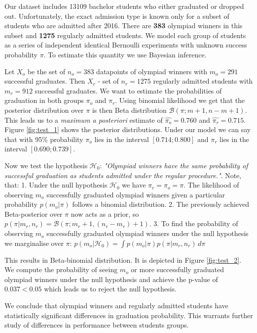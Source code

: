 \documentclass{article}
\begin{document}
Our dataset includes 13109 bachelor students who either graduated or dropped out. Unfortunately, the exact admission type is known only for a subset of students who are admitted after 2016. There are \textbf{383} olympiad winners in this subset and \textbf{1275} regularly admitted students. We model each group of students as a series of independent identical Bernoulli experiments with unknown success probability $\pi$. To estimate this quantity we use Bayesian inference.

Let $X_o$ be the set of $n_o = 383$ datapoints of olympiad winners with $m_o = 291$ successful graduates. Then $X_r$ - set of $n_r = 1275$ regularly admitted students with $m_r = 912$ successful graduates.
We want to estimate the probabilities of graduation in both groups $\pi_o$ and $\pi_r$. Using binomial likelihood we get that the posterior distribution over $\pi$ is then Beta distribution $\mathcal{B}(\pi ; m+1,n-m+1)$. This leads us to a \textit{maximum a posteriori} estimate of
$\hat{\pi_o} = 0.760$ and
$\hat{\pi_r} = 0.715$. Figure \ref{fig:test_1} shows the posterior distributions.
Under our model we can say that with 95\% probability $\pi_o$ lies in the interval $[0.714;0.800]$ and $\pi_r$ lies in the interval $[0.690;0.739]$.

Now we test the hypothesis $\mathcal{H}_0$: \textit{"Olympiad winners have the same probability of successful graduation as students admitted under the regular procedure."}. Note, that: 1. Under the null hypothesis $\mathcal{H}_0$ we have $\pi_r = \pi_o = \pi$. The likelihood of observing $m_o$ successfully graduated olympiad winners given a particular probability $p(m_o| \pi)$ follows a binomial distribution. 2. The previously achieved Beta-posterior over $\pi$ now acts as a prior, so $ p(\pi | m_r, n_r) = \mathcal{B}(\pi;m_r+1, (n_r - m_r) + 1)$. 3. To find the probability of observing $m_o$ successfully graduated olympiad winners under the null hypothesis we marginalise over $\pi$: $p(m_o | \mathcal{H}_0) = \int p(m_o | \pi) p(\pi | m_r, n_r)\,d\pi$

This results in Beta-binomial distribution\cite{hyp_testing}. It is depicted in Figure \ref{fig:test_2}.
We compute the probability of seeing $m_o$ or more successfully graduated olympiad winners under the null hypothesis and achieve the p-value of $0.037 < 0.05$ which leads us to reject the null hypothesis.

We conclude that olympiad winners and regularly admitted students have statistically significant differences in graduation probability. This warrants further study of differences in performance between students groups.
\end{document}
